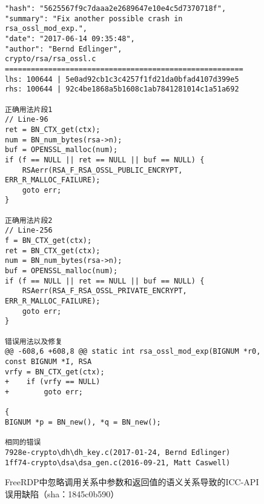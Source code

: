 \begin{figure}[t]
	\centering
\begin{lstlisting}
"hash": "5625567f9c7daaa2e2689647e10e4c5d7370718f",
"summary": "Fix another possible crash in rsa_ossl_mod_exp.",
"date": "2017-06-14 09:35:48",
"author": "Bernd Edlinger",
crypto/rsa/rsa_ossl.c
=======================================================
lhs: 100644 | 5e0ad92cb1c3c4257f1fd21da0bfad4107d399e5
rhs: 100644 | 92c4be1868a5b1608c1ab7841281014c1a51a692

正确用法片段1
// Line-96
ret = BN_CTX_get(ctx);
num = BN_num_bytes(rsa->n);
buf = OPENSSL_malloc(num);
if (f == NULL || ret == NULL || buf == NULL) {
	RSAerr(RSA_F_RSA_OSSL_PUBLIC_ENCRYPT, ERR_R_MALLOC_FAILURE);
	goto err;
}

正确用法片段2
// Line-256
f = BN_CTX_get(ctx);
ret = BN_CTX_get(ctx);
num = BN_num_bytes(rsa->n);
buf = OPENSSL_malloc(num);
if (f == NULL || ret == NULL || buf == NULL) {
	RSAerr(RSA_F_RSA_OSSL_PRIVATE_ENCRYPT, ERR_R_MALLOC_FAILURE);
	goto err;
}

错误用法以及修复
@@ -608,6 +608,8 @@ static int rsa_ossl_mod_exp(BIGNUM *r0, const BIGNUM *I, RSA 
vrfy = BN_CTX_get(ctx);
+    if (vrfy == NULL)
+        goto err;

{
BIGNUM *p = BN_new(), *q = BN_new();

相同的错误
7928e-crypto\dh\dh_key.c(2017-01-24, Bernd Edlinger)
1ff74-crypto\dsa\dsa_gen.c(2016-09-21, Matt Caswell)
\end{lstlisting}
	\caption{
	FreeRDP中忽略调用关系中参数和返回值的语义关系导致的ICC-API误用缺陷（sha：1845c0b590）
	}
	\label{fig:2-3-dul}
\end{figure}